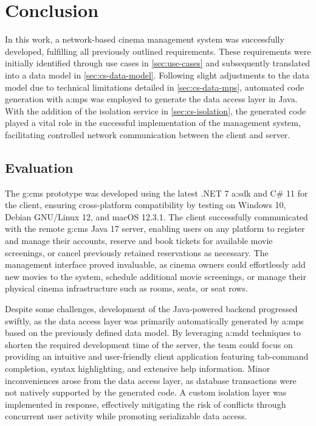 \chapter{Conclusion}
\label{ch:conclusion}

In this work, a network-based cinema management system was successfully developed, fulfilling all previously outlined requirements. These requirements were initially identified through use cases in \cref{sec:use-cases} and subsequently translated into a data model in \cref{sec:cs-data-model}. Following slight adjustments to the data model due to technical limitations detailed in \cref{sec:cs-data-mps}, automated code generation with \gls{a:mps} was employed to generate the data access layer in Java. With the addition of the isolation service in \cref{sec:cs-isolation}, the generated code played a vital role in the successful implementation of the management system, facilitating controlled network communication between the client and server.

\section{Evaluation}
The \gls{g:cms} prototype was developed using the latest .NET 7 \gls{a:sdk} and C\# 11 for the client, ensuring cross-platform compatibility by testing on Windows 10, Debian GNU/Linux 12, and macOS 12.3.1. The client successfully communicated with the remote \gls{g:cms} Java 17 server, enabling users on any platform to register and manage their accounts, reserve and book tickets for available movie screenings, or cancel previously retained reservations as necessary. The management interface proved invaluable, as cinema owners could effortlessly add new movies to the system, schedule additional movie screenings, or manage their physical cinema infrastructure such as rooms, seats, or seat rows.

Despite some challenges, development of the Java-powered backend progressed swiftly, as the data access layer was primarily automatically generated by \gls{a:mps} based on the previously defined data model. By leveraging \gls{a:mdd} techniques to shorten the required development time of the server, the team could focus on providing an intuitive and user-friendly client application featuring tab-command completion, syntax highlighting, and extensive help information. Minor inconveniences arose from the data access layer, as database transactions were not natively supported by the generated code. A custom isolation layer was implemented in response, effectively mitigating the risk of conflicts through concurrent user activity while promoting serializable data access.

